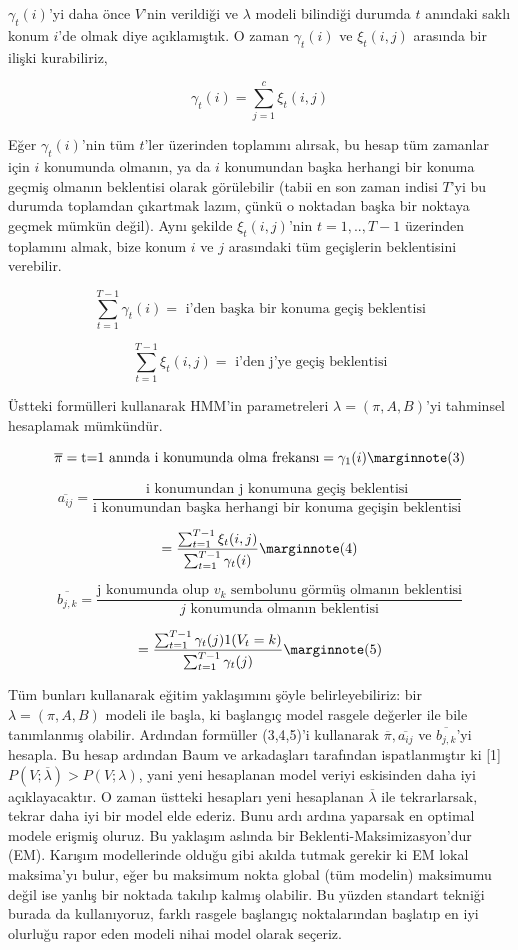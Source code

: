 \documentclass[12pt,fleqn]{article}\usepackage{../../common}
\begin{document}
$\gamma_t(i)$'yi daha önce $V$'nin verildiği ve $\lambda$ modeli bilindiği
durumda $t$ anındaki saklı konum $i$'de olmak diye açıklamıştık. O zaman 
$\gamma_t(i)$ ve $\xi_t(i,j)$ arasında bir ilişki kurabiliriz,

$$ \gamma_t(i) =  \sum_{j=1}^{c} \xi_t(i,j) $$

Eğer $\gamma_t(i)$'nin tüm $t$'ler üzerinden toplamını alırsak, bu hesap
tüm zamanlar için $i$ konumunda olmanın, ya da $i$ konumundan başka
herhangi bir konuma geçmiş olmanın beklentisi olarak görülebilir (tabii en
son zaman indisi $T$'yi bu durumda toplamdan çıkartmak lazım, çünkü o
noktadan başka bir noktaya geçmek mümkün değil). Aynı şekilde
$\xi_t(i,j)$'nin $t=1,..,T-1$ üzerinden toplamını almak, bize konum $i$ ve
$j$ arasındaki tüm geçişlerin beklentisini verebilir.


$$ \sum_{t=1}^{T-1} \gamma_t(i) = \textrm{ i'den başka bir konuma geçiş beklentisi} $$

$$ \sum_{t=1}^{T-1} \xi_t(i,j) = \textrm{ i'den j'ye geçiş beklentisi} $$

Üstteki formülleri kullanarak HMM'in parametreleri $\lambda = (\pi,A,B)$'yi
tahminsel hesaplamak mümkündür. 

$$ \overline{\pi} = \textrm{t=1 anında i konumunda olma frekansı} = \gamma_1(i)
\mlabel{3}
$$

$$ \overline{a_{ij}} = \frac{\textrm{i konumundan j konumuna geçiş beklentisi}}
{\textrm{i konumundan başka herhangi bir konuma geçişin beklentisi}}
$$

$$  = \frac{ \sum_{t=1}^{T-1}\xi_t(i,j) }{ \sum_{t=1}^{T-1} \gamma_t(i) } 
\mlabel{4}
$$

$$ 
\overline{b_{j,k}} = 
\frac{\textrm{j konumunda olup } v_k \textrm{ sembolunu görmüş olmanın beklentisi}}
{j \textrm{ konumunda olmanın beklentisi} }
 $$

$$ = \frac{\sum_{t=1}^{T-1} \gamma_t(j) 1(V_t=k) }{\sum_{t=1}^{T-1}\gamma_t(j) } 
\mlabel{5}
$$

Tüm bunları kullanarak eğitim yaklaşımını şöyle belirleyebiliriz: bir
$\lambda=(\pi,A,B)$ modeli ile başla, ki başlangıç model rasgele değerler
ile bile tanımlanmış olabilir. Ardından formüller (3,4,5)'i kullanarak
$\overline{\pi},\overline{a_{ij}}$ ve $\overline{b_{j,k}}$'yi hesapla. Bu
hesap  ardından Baum ve arkadaşları  tarafından ispatlanmıştır ki [1]
$P(V;\overline{\lambda}) > P(V;\lambda)$, yani  yeni hesaplanan model
veriyi  eskisinden daha iyi açıklayacaktır.  O zaman  üstteki hesapları 
yeni hesaplanan $\overline{\lambda}$ ile tekrarlarsak, tekrar daha 
iyi bir model elde ederiz. Bunu ardı ardına yaparsak en optimal 
modele erişmiş oluruz. Bu yaklaşım aslında bir Beklenti-Maksimizasyon'dur (EM). 
Karışım modellerinde olduğu gibi akılda tutmak gerekir ki EM lokal
maksima'yı bulur, eğer bu maksimum nokta global (tüm modelin) maksimumu
değil ise yanlış bir noktada takılıp kalmış olabilir. Bu yüzden standart
tekniği burada da kullanıyoruz, farklı rasgele başlangıç noktalarından
başlatıp en iyi olurluğu rapor eden modeli nihai model olarak seçeriz. 
\end{document}
